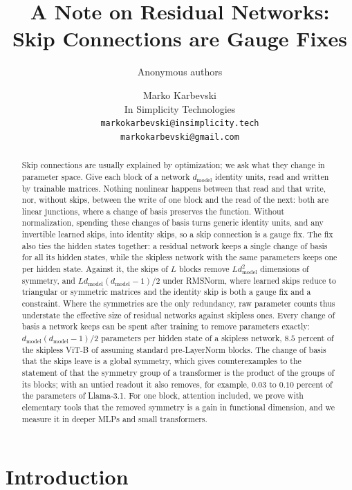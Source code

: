 \documentclass[10pt]{article}
\title{\Large\bfseries\boldmath A Note on Residual Networks:\\ Skip Connections are Gauge Fixes}
\author{Anonymous authors}
\author{Marko Karbevski\\ In Simplicity Technologies\\ {\small\texttt{markokarbevski@insimplicity.tech}}\\ {\small\texttt{markokarbevski@gmail.com}}}
\date{}
\theoremstyle{definition}
\theoremstyle{remark}
\newcommand{\dm}{d_{\mathrm{model}}}
\begin{document}
\maketitle
\suppressfloats[t]
\vspace{-1.5em}

\begin{abstract}
\noindent Skip connections are usually explained by optimization; we ask what they change in parameter space. Give each block of a network $\dm$ identity units, read and written by trainable matrices. Nothing nonlinear happens between that read and that write, nor, without skips, between the write of one block and the read of the next: both are linear junctions, where a change of basis preserves the function. Without normalization, spending these changes of basis turns generic identity units, and any invertible learned skips, into identity skips, so a skip connection is a gauge fix. The fix also ties the hidden states together: a residual network keeps a single change of basis for all its hidden states, while the skipless network with the same parameters keeps one per hidden state. Against it, the skips of $L$ blocks remove $L\dm^2$ dimensions of symmetry, and $L\dm(\dm-1)/2$ under RMSNorm, where learned skips reduce to triangular or symmetric matrices and the identity skip is both a gauge fix and a constraint. Where the symmetries are the only redundancy, raw parameter counts thus understate the effective size of residual networks against skipless ones. Every change of basis a network keeps can be spent after training to remove parameters exactly: $\dm(\dm-1)/2$ parameters per hidden state of a skipless network, $8.5$ percent of the skipless ViT-B of \citet{ji2026cutting} assuming standard pre-LayerNorm blocks. The change of basis that the skips leave is a global symmetry, which gives counterexamples to the statement of \citet{wang2025gauge} that the symmetry group of a transformer is the product of the groups of its blocks; with an untied readout it also removes, for example, $0.03$ to $0.10$ percent of the parameters of Llama-3.1. For one block, attention included, we prove with elementary tools that the removed symmetry is a gain in functional dimension, and we measure it in deeper MLPs and small transformers.
\end{abstract}

\section{Introduction}\label{sec:intro}
\end{document}
